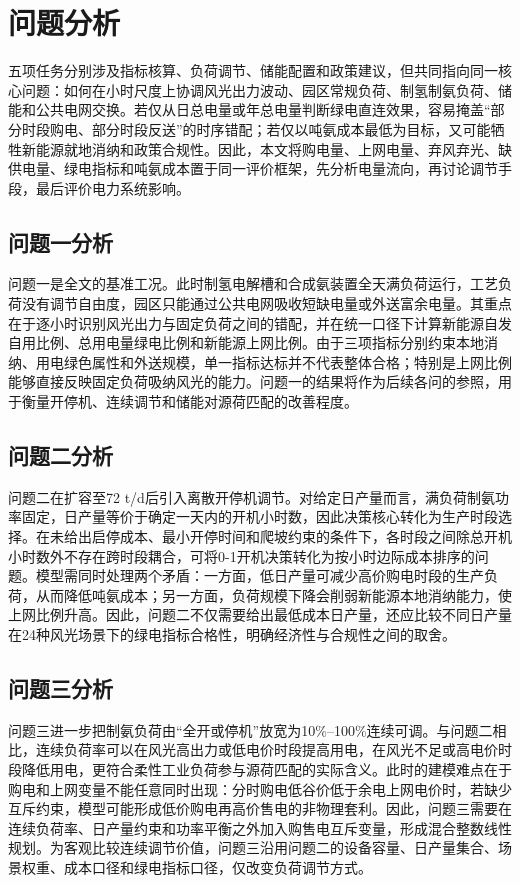 \documentclass[UTF8,a4paper,12pt]{ctexart}
\begin{document}
\section{问题分析}

五项任务分别涉及指标核算、负荷调节、储能配置和政策建议，但共同指向同一核心问题：如何在小时尺度上协调风光出力波动、园区常规负荷、制氢制氨负荷、储能和公共电网交换。若仅从日总电量或年总电量判断绿电直连效果，容易掩盖“部分时段购电、部分时段反送”的时序错配；若仅以吨氨成本最低为目标，又可能牺牲新能源就地消纳和政策合规性。因此，本文将购电量、上网电量、弃风弃光、缺供电量、绿电指标和吨氨成本置于同一评价框架，先分析电量流向，再讨论调节手段，最后评价电力系统影响。

\subsection{问题一分析}

问题一是全文的基准工况。此时制氢电解槽和合成氨装置全天满负荷运行，工艺负荷没有调节自由度，园区只能通过公共电网吸收短缺电量或外送富余电量。其重点在于逐小时识别风光出力与固定负荷之间的错配，并在统一口径下计算新能源自发自用比例、总用电量绿电比例和新能源上网比例。由于三项指标分别约束本地消纳、用电绿色属性和外送规模，单一指标达标并不代表整体合格；特别是上网比例能够直接反映固定负荷吸纳风光的能力。问题一的结果将作为后续各问的参照，用于衡量开停机、连续调节和储能对源荷匹配的改善程度。

\subsection{问题二分析}

问题二在扩容至72 t/d后引入离散开停机调节。对给定日产量而言，满负荷制氨功率固定，日产量等价于确定一天内的开机小时数，因此决策核心转化为生产时段选择。在未给出启停成本、最小开停时间和爬坡约束的条件下，各时段之间除总开机小时数外不存在跨时段耦合，可将0-1开机决策转化为按小时边际成本排序的问题。模型需同时处理两个矛盾：一方面，低日产量可减少高价购电时段的生产负荷，从而降低吨氨成本；另一方面，负荷规模下降会削弱新能源本地消纳能力，使上网比例升高。因此，问题二不仅需要给出最低成本日产量，还应比较不同日产量在24种风光场景下的绿电指标合格性，明确经济性与合规性之间的取舍。

\subsection{问题三分析}

问题三进一步把制氨负荷由“全开或停机”放宽为10\%--100\%连续可调。与问题二相比，连续负荷率可以在风光高出力或低电价时段提高用电，在风光不足或高电价时段降低用电，更符合柔性工业负荷参与源荷匹配的实际含义。此时的建模难点在于购电和上网变量不能任意同时出现：分时购电低谷价低于余电上网电价时，若缺少互斥约束，模型可能形成低价购电再高价售电的非物理套利。因此，问题三需要在连续负荷率、日产量约束和功率平衡之外加入购售电互斥变量，形成混合整数线性规划。为客观比较连续调节价值，问题三沿用问题二的设备容量、日产量集合、场景权重、成本口径和绿电指标口径，仅改变负荷调节方式。
\end{document}

